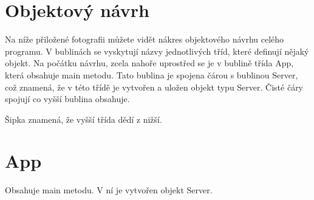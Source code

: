 \documentclass[12pt,a4paper]{report}
\begin{document}
\section{Objektový návrh}
Na níže přiložené fotografii můžete vidět nákres objektového návrhu celého programu. V bublinách se vyskytují názvy jednotlivých tříd, které definují nějaký objekt. Na počátku návrhu, zcela nahoře uprostřed se je v bublině třída App, která obsahuje main metodu. Tato bublina je spojena čárou s bublinou Server, což znamená, že v této třídě je vytvořen a uložen objekt typu Server. Čisté čáry spojují co vyšší bublina obsahuje. 

Šipka znamená, že vyšší třída dědí z nižší.
  
\begin{center}
\end{center}
\section{App}
Obsahuje main metodu. V ní je vytvořen objekt Server.
\end{document}

